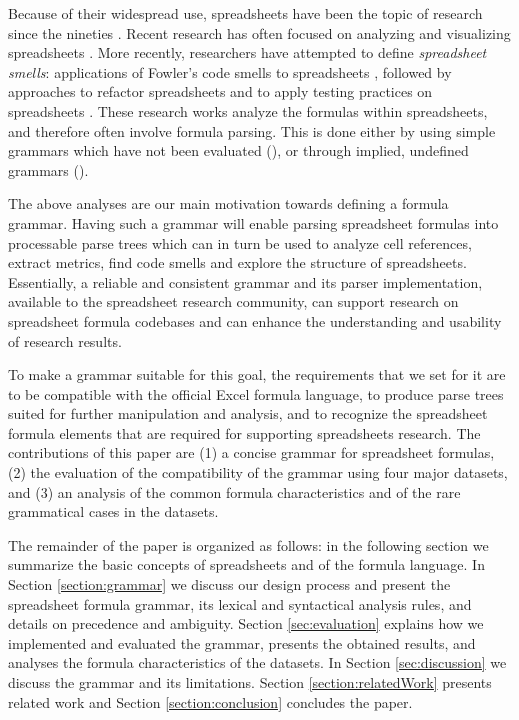 \documentclass[times]{smrauth}
\begin{document}
Because of their widespread use, spreadsheets have been the topic of research since the nineties \cite{DBLP:journals/sigplan/BellP93}. Recent research has often focused on analyzing and visualizing spreadsheets \cite{DBLP:conf/icse/HermansPD11, Shio1999}. More recently, researchers have attempted to define \emph{spreadsheet smells}: applications of Fowler's code smells to spreadsheets \cite{DBLP:conf/icse/HermansPD12, DBLP:conf/icsm/Hermans212}, followed by approaches to refactor spreadsheets \cite{hermans2014bumblebee,badame2012refactoring} and to apply testing practices on spreadsheets \cite{Expector}. These research works analyze the formulas within spreadsheets, and therefore often involve formula parsing. This is done either by using simple grammars which have not been evaluated (\cite{badame2012refactoring}), or through implied, undefined grammars (\cite{DBLP:conf/icse/HermansPD11,DBLP:conf/icse/HermansPD12, DBLP:conf/icsm/Hermans212, hermans2014bumblebee, Expector}). 

The above analyses are our main motivation towards defining a formula grammar. Having such a grammar will enable parsing spreadsheet formulas into processable parse trees which can in turn be used to analyze cell references, extract metrics, find code smells and explore the structure of spreadsheets. Essentially, a reliable and consistent grammar and its parser implementation, available to the spreadsheet research community, can support research on spreadsheet formula codebases and can enhance the understanding and usability of research results.

To make a grammar suitable for this goal, the requirements that we set for it are to be compatible with the official Excel formula language, to produce parse trees suited for further manipulation and analysis, and to recognize the spreadsheet formula elements that are required for supporting spreadsheets research. The contributions of this paper are (1) a concise grammar for spreadsheet formulas, (2) the evaluation of the compatibility of the grammar using four major datasets, and (3) an analysis of the common formula characteristics and of the rare grammatical cases in the datasets.

The remainder of the paper is organized as follows: in the following section we summarize the basic concepts of spreadsheets and of the formula language. In Section \ref{section:grammar} we discuss our design process and present the spreadsheet formula grammar, its lexical and syntactical analysis rules, and details on precedence and ambiguity. Section \ref{sec:evaluation} explains how we implemented and evaluated the grammar, presents the obtained results, and analyses the formula characteristics of the datasets. In Section \ref{sec:discussion} we discuss the grammar and its limitations. Section \ref{section:relatedWork} presents related work and Section \ref{section:conclusion} concludes the paper.
\end{document}
